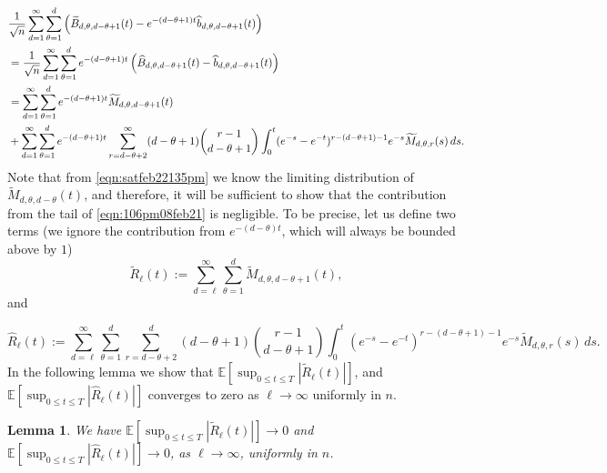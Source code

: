 \documentclass[11pt]{article}
\newtheorem{lemma}[theorem]{Lemma}
\begin{document}
    \begin{align}\label{eqn:106pm08feb21}
    &\frac{1}{\sqrt{n}} \sum_{d=1}^{\infty}\sum_{\theta=1}^{d}\left(\widetilde{B}_{d,\theta,d-\theta+1}(t) - e^{-(d-\theta+1) t}\widehat{b}_{d,\theta,d-\theta+1}(t )\right)  \notag \\
    &= \frac{1}{\sqrt{n}} \sum_{d=1}^{\infty}\sum_{\theta=1}^{d}e^{-(d-\theta+1) t}\left(\widehat{B}_{d,\theta, d-\theta+1}(t ) - \widehat{b}_{d,\theta,d-\theta+1}(t )\right)\notag \\
    &=  \sum_{d=1}^{\infty}\sum_{\theta=1}^{d} e^{-(d-\theta+1) t}\widetilde{M}_{d, \theta, d-\theta+1}(t) \notag\\
    &+ \sum_{d=1}^{\infty}\sum_{\theta=1}^{d}e^{-(d-\theta+1) t}\sum_{r=d-\theta+2}^{\infty}(d-\theta+1){r-1\choose d-\theta+1 }\int_{0}^t(e^{-s}-e^{-t})^{r-(d-\theta+1)-1}e^{-s} \widetilde{M}_{d,\theta,r}(s) \, ds. 
    \end{align}
Note that from \eqref{eqn:satfeb22135pm} we know the limiting distribution of $\widetilde{M}_{d, \theta, d-\theta}(t)$, and therefore, it will be sufficient to show that the contribution from the tail of \eqref{eqn:106pm08feb21} is negligible. To be precise, let us define two terms (we ignore the contribution from $e^{-(d-\theta) t}$, which will always be bounded above by $1$)
 $$\widetilde{R}_{\ell}(t):= \sum_{d =\ell}^{\infty}\sum_{\theta=1}^{d} \widetilde{M}_{d, \theta, d-\theta+1}(t),$$ and  
 
 $$\widehat{R}_{\ell}(t):= \sum_{d= \ell}^{\infty}\sum_{\theta=1}^{d}\sum_{r=d-\theta+2}^{d}(d-\theta+1){r-1\choose d-\theta+1 }\int_{0}^t(e^{-s}-e^{-t})^{r-(d-\theta+1)-1}e^{-s} \widetilde{M}_{d, \theta, r}(s) \, ds.$$
In the following lemma we show that $\mathbb{E} \left[ \sup_{0\leq t\leq T} \left| \widetilde{R}_{\ell}(t)\right|\right]$, and $ \mathbb{E} \left[ \sup_{0\leq t\leq T} \left| \widehat{R}_{\ell}(t)\right|\right]$ converges to zero as $\ell\rightarrow \infty$ uniformly in $n$.

\begin{lemma}\label{lem:418pm27feb21}
We have 
$\mathbb{E} \left[ \sup_{0\leq t\leq T} \left| \widetilde{R}_{\ell}(t)\right|\right]\to 0$ and $ \mathbb{E} \left[ \sup_{0\leq t\leq T} \left| \widehat{R}_{\ell}(t)\right|\right] \to 0$, as $\ell\rightarrow \infty$, uniformly in $n$.
\end{lemma}
\end{document}
